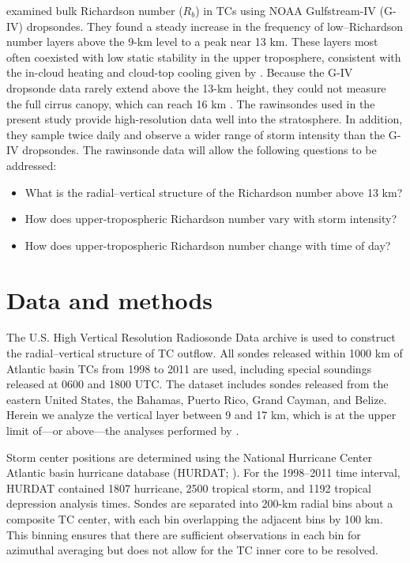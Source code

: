 \cite{Molinarietal2014} examined bulk Richardson number ($R_b$) in TCs using NOAA Gulfstream-IV (G-IV) dropsondes.
They found a steady increase in the frequency of low--Richardson number layers above the 9-km level to a peak near 13 km.
These layers most often coexisted with low static stability in the upper troposphere, consistent with the in-cloud heating and cloud-top cooling given by \cite{Buetal2014}.
Because the G-IV dropsonde data rarely extend above the 13-km height, they could not measure the full cirrus canopy, which can reach 16 km \cite{Waco1970}.
The rawinsondes used in the present study provide high-resolution data well into the stratosphere.
In addition, they sample twice daily and observe a wider range of storm intensity than the G-IV dropsondes.
The rawinsonde data will allow the following questions to be addressed:
\begin{itemize}
   \item What is the radial–vertical structure of the Richardson number above 13 km?
   \item How does upper-tropospheric Richardson number vary with storm intensity?
   \item How does upper-tropospheric Richardson number change with time of day?
\end{itemize}

\section{Data and methods}
The U.S. High Vertical Resolution Radiosonde Data archive \citep{LoveGeller2012} is used to construct the radial–vertical structure of TC outflow.
All sondes released within 1000 km of Atlantic basin TCs from 1998 to 2011 are used, including special soundings released at 0600 and 1800 UTC.
The dataset includes sondes released from the eastern United States, the Bahamas, Puerto Rico, Grand Cayman, and Belize.
Herein we analyze the vertical layer between 9 and 17 km, which is at the upper limit of---or above---the analyses performed by \cite{Molinarietal2014}.

Storm center positions are determined using the National Hurricane Center Atlantic basin hurricane database (HURDAT; \citeauthor{Jarvinenetal1984} \citeyear{Jarvinenetal1984}).
For the 1998–2011 time interval, HURDAT contained 1807 hurricane, 2500 tropical storm, and 1192 tropical depression analysis times.
Sondes are separated into 200-km radial bins about a composite TC center, with each bin overlapping the adjacent bins by 100 km.
This binning ensures that there are sufficient observations in each bin for azimuthal averaging but does not allow for the TC inner core to be resolved.

